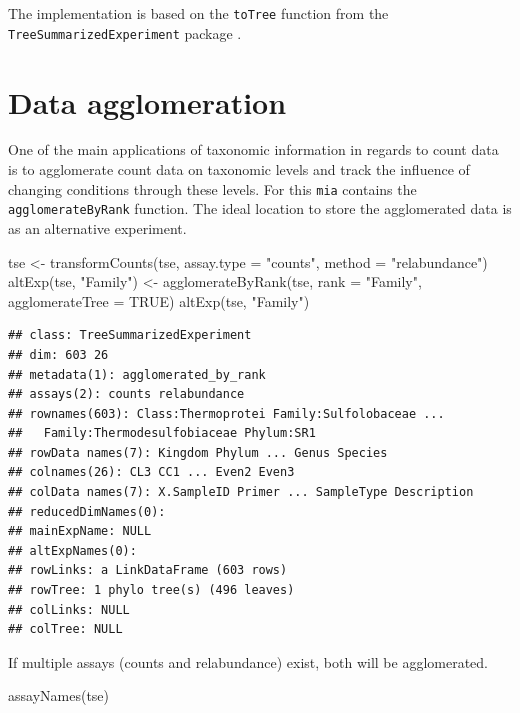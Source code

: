 \documentclass[
]{book}
\newenvironment{Shaded}{\begin{snugshade}}{\end{snugshade}}
\newcommand{\AttributeTok}[1]{\textcolor[rgb]{0.77,0.63,0.00}{#1}}
\newcommand{\ConstantTok}[1]{\textcolor[rgb]{0.00,0.00,0.00}{#1}}
\newcommand{\FunctionTok}[1]{\textcolor[rgb]{0.00,0.00,0.00}{#1}}
\newcommand{\NormalTok}[1]{#1}
\newcommand{\OtherTok}[1]{\textcolor[rgb]{0.56,0.35,0.01}{#1}}
\newcommand{\StringTok}[1]{\textcolor[rgb]{0.31,0.60,0.02}{#1}}
\begin{document}
The implementation is based on the \texttt{toTree} function from the
\texttt{TreeSummarizedExperiment} package \citep{R_TreeSummarizedExperiment}.

\hypertarget{data-agglomeration}{%
\section{Data agglomeration}\label{data-agglomeration}}

One of the main applications of taxonomic information in regards to count data
is to agglomerate count data on taxonomic levels and track the influence of
changing conditions through these levels. For this \texttt{mia} contains the
\texttt{agglomerateByRank} function. The ideal location to store the agglomerated data
is as an alternative experiment.

\begin{Shaded}
\begin{Highlighting}[]
\NormalTok{tse }\OtherTok{\textless{}{-}} \FunctionTok{transformCounts}\NormalTok{(tse, }\AttributeTok{assay.type =} \StringTok{"counts"}\NormalTok{, }\AttributeTok{method =} \StringTok{"relabundance"}\NormalTok{)}
\FunctionTok{altExp}\NormalTok{(tse, }\StringTok{"Family"}\NormalTok{) }\OtherTok{\textless{}{-}} \FunctionTok{agglomerateByRank}\NormalTok{(tse, }\AttributeTok{rank =} \StringTok{"Family"}\NormalTok{,}
                                           \AttributeTok{agglomerateTree =} \ConstantTok{TRUE}\NormalTok{)}
\FunctionTok{altExp}\NormalTok{(tse, }\StringTok{"Family"}\NormalTok{)}
\end{Highlighting}
\end{Shaded}

\begin{verbatim}
## class: TreeSummarizedExperiment 
## dim: 603 26 
## metadata(1): agglomerated_by_rank
## assays(2): counts relabundance
## rownames(603): Class:Thermoprotei Family:Sulfolobaceae ...
##   Family:Thermodesulfobiaceae Phylum:SR1
## rowData names(7): Kingdom Phylum ... Genus Species
## colnames(26): CL3 CC1 ... Even2 Even3
## colData names(7): X.SampleID Primer ... SampleType Description
## reducedDimNames(0):
## mainExpName: NULL
## altExpNames(0):
## rowLinks: a LinkDataFrame (603 rows)
## rowTree: 1 phylo tree(s) (496 leaves)
## colLinks: NULL
## colTree: NULL
\end{verbatim}

If multiple assays (counts and relabundance) exist, both will be agglomerated.

\begin{Shaded}
\begin{Highlighting}[]
\FunctionTok{assayNames}\NormalTok{(tse)}
\end{Highlighting}
\end{Shaded}
\end{document}
